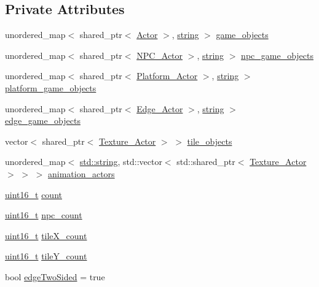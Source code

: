\subsection*{Private Attributes}
\begin{DoxyCompactItemize}
\item 
unordered\+\_\+map$<$ shared\+\_\+ptr$<$ \hyperlink{classActor}{Actor} $>$, \hyperlink{imgui__impl__opengl3__loader_8h_ac83513893df92266f79a515488701770}{string} $>$ \hyperlink{classLoadingGameObjects_a31587580893fcdc170d52658875e47e4}{game\+\_\+objects}
\item 
unordered\+\_\+map$<$ shared\+\_\+ptr$<$ \hyperlink{classNPC__Actor}{N\+P\+C\+\_\+\+Actor} $>$, \hyperlink{imgui__impl__opengl3__loader_8h_ac83513893df92266f79a515488701770}{string} $>$ \hyperlink{classLoadingGameObjects_a738d2c12124f79d764ec2384667586f1}{npc\+\_\+game\+\_\+objects}
\item 
unordered\+\_\+map$<$ shared\+\_\+ptr$<$ \hyperlink{classPlatform__Actor}{Platform\+\_\+\+Actor} $>$, \hyperlink{imgui__impl__opengl3__loader_8h_ac83513893df92266f79a515488701770}{string} $>$ \hyperlink{classLoadingGameObjects_ab7d370b264bd267794cd5b7a9e84b6e8}{platform\+\_\+game\+\_\+objects}
\item 
unordered\+\_\+map$<$ shared\+\_\+ptr$<$ \hyperlink{classEdge__Actor}{Edge\+\_\+\+Actor} $>$, \hyperlink{imgui__impl__opengl3__loader_8h_ac83513893df92266f79a515488701770}{string} $>$ \hyperlink{classLoadingGameObjects_a937059750e1f304923ad19ede9f567e9}{edge\+\_\+game\+\_\+objects}
\item 
vector$<$ shared\+\_\+ptr$<$ \hyperlink{classTexture__Actor}{Texture\+\_\+\+Actor} $>$ $>$ \hyperlink{classLoadingGameObjects_aa25d44773be9d0a524273f227501bd82}{tile\+\_\+objects}
\item 
unordered\+\_\+map$<$ \hyperlink{imgui__impl__opengl3__loader_8h_ac83513893df92266f79a515488701770}{std\+::string}, std\+::vector$<$ std\+::shared\+\_\+ptr$<$ \hyperlink{classTexture__Actor}{Texture\+\_\+\+Actor} $>$ $>$ $>$ \hyperlink{classLoadingGameObjects_aea5b1535e5a16fde969e46e080b35766}{animation\+\_\+actors}
\item 
\hyperlink{stdint_8h_a273cf69d639a59973b6019625df33e30}{uint16\+\_\+t} \hyperlink{classLoadingGameObjects_abc9c627389cd920a6e958a366a47fc02}{count}
\item 
\hyperlink{stdint_8h_a273cf69d639a59973b6019625df33e30}{uint16\+\_\+t} \hyperlink{classLoadingGameObjects_a4377501d8fc93efd69ab3ecbc654335d}{npc\+\_\+count}
\item 
\hyperlink{stdint_8h_a273cf69d639a59973b6019625df33e30}{uint16\+\_\+t} \hyperlink{classLoadingGameObjects_af6f32e0af9f744e1c9c1c9858e55aa01}{tile\+X\+\_\+count}
\item 
\hyperlink{stdint_8h_a273cf69d639a59973b6019625df33e30}{uint16\+\_\+t} \hyperlink{classLoadingGameObjects_a495a78b57ba4ae5d3932dd2b12496d59}{tile\+Y\+\_\+count}
\item 
bool \hyperlink{classLoadingGameObjects_a4e944dc5dbf8496d0a283a3289ebbb2a}{edge\+Two\+Sided} = true
\end{DoxyCompactItemize}


